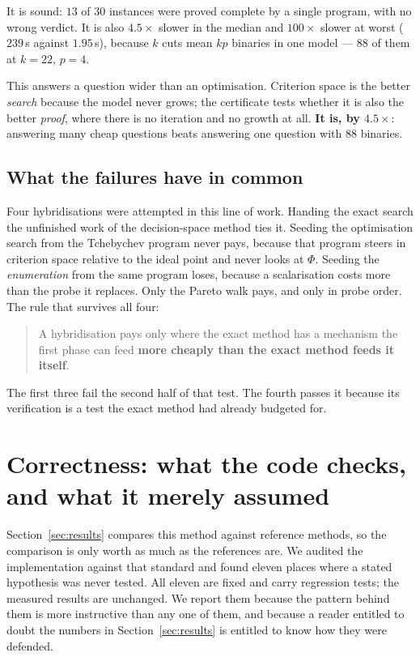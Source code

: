 \documentclass[11pt,a4paper]{article}
\begin{document}
It is sound: $13$ of $30$ instances were proved complete by a single program,
with no wrong verdict.  It is also $4.5\times$ slower in the median and
$100\times$ slower at worst ($239$\,s against $1.95$\,s), because $k$ cuts mean
$kp$ binaries in one model --- $88$ of them at $k = 22$, $p = 4$.

This answers a question wider than an optimisation.  Criterion space is the
better \emph{search} because the model never grows; the certificate tests
whether it is also the better \emph{proof}, where there is no iteration and no
growth at all.  \textbf{It is, by $4.5\times$}: answering many cheap questions
beats answering one question with $88$ binaries.

\subsection{What the failures have in common}

Four hybridisations were attempted in this line of work.  Handing the exact
search the unfinished work of the decision-space method ties it.  Seeding the
optimisation search from the Tchebychev program never pays, because that
program steers in criterion space relative to the ideal point and never looks
at $\Phi$.  Seeding the \emph{enumeration} from the same program loses, because
a scalarisation costs more than the probe it replaces.  Only the Pareto walk
pays, and only in probe order.  The rule that survives all four:

\begin{quote}
A hybridisation pays only where the exact method has a mechanism the first
phase can feed \textbf{more cheaply than the exact method feeds it itself}.
\end{quote}

\noindent
The first three fail the second half of that test.  The fourth passes it
because its verification is a test the exact method had already budgeted for.

\section{Correctness: what the code checks, and what it merely assumed}
\label{sec:audit}

Section~\ref{sec:results} compares this method against reference methods, so
the comparison is only worth as much as the references are.  We audited the
implementation against that standard and found eleven places where a stated
hypothesis was never tested.  All eleven are fixed and carry regression tests;
the measured results are unchanged.  We report them because the pattern behind
them is more instructive than any one of them, and because a reader entitled to
doubt the numbers in Section~\ref{sec:results} is entitled to know how they
were defended.
\end{document}
